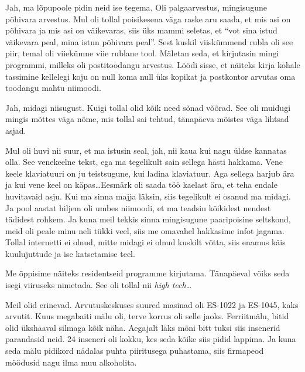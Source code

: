 
Jah, ma lõpupoole pidin neid ise tegema. Oli palgaarvestus, mingisugune põhivara arvestus. Mul oli tollal poisikesena väga raske aru saada, et mis asi on põhivara ja mis asi on väikevaras, siis üks mammi seletas, et \enquote{vot sina istud väikevara peal, mina istun põhivara peal}. Sest kuskil viiskümmend rubla oli see piir, temal oli  viiekümne viie rublane tool. Mäletan seda, et kirjutasin mingi programmi, milleks oli postitoodangu arvestus. Löödi sisse, et  näiteks kirja kohale tassimine kellelegi koju on null koma null üks kopikat ja postkontor arvutas oma toodangu mahtu niimoodi. 


Jah, midagi niisugust. Kuigi tollal olid kõik need sõnad võõrad. See oli muidugi mingis mõttes väga nõme, mis tollal sai tehtud, tänapäeva mõistes väga lihtsad asjad. 


Mul oli huvi nii suur, et ma istusin seal, jah, nii kaua kui nagu üldse kannatas olla. See venekeelne tekst, ega ma tegelikult sain sellega hästi hakkama. Vene keele klaviatuuri on ju teistsugune, kui ladina klaviatuur. Aga sellega harjub ära ja kui vene keel on käpas\ldots Eesmärk oli saada töö kaelast ära, et teha endale huvitavaid asju. Kui ma sinna majja läksin, siis tegelikult ei osanud ma midagi. Ja pool aastat hiljem oli umbes niimoodi, et ma teadsin kõikidest nendest tädidest rohkem. Ja kuna meil tekkis sinna mingisugune paaripoisine seltskond, meid oli  peale minu neli tükki veel, siis me omavahel hakkasime infot jagama. Tollal internetti ei olnud, mitte midagi ei olnud kuskilt võtta, siis enamus käis kuulujuttude ja ise katsetamise teel. 

Me õppisime näiteks residentseid programme kirjutama. Tänapäeval võiks seda isegi viiruseks nimetada.  See oli tollal nii \emph{high tech}\ldots


Meil olid erinevad. Arvutuskeskuses suured masinad oli ES-1022 ja ES-1045, kaks arvutit. Kuus megabaiti mälu oli, terve korrus oli selle jaoks. Ferriitmälu, bitid olid ükshaaval silmaga kõik näha. Aegajalt läks mõni bitt tuksi siis insenerid parandasid neid. 24 inseneri oli kokku, kes seda kõike siis pidid lappima. Ja kuna seda mälu pidikord nädalas puhta piiritusega puhastama, siis firmapeod möödusid nagu ilma muu alkoholita.  

